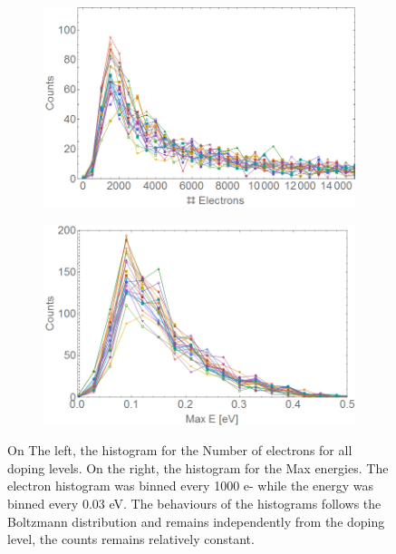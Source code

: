 \begin{figure}[h!]
\centering
\begin{subfigure}[l]{0.49\textwidth}
\includegraphics[width=1\textwidth]{../Images/results/MIR_He_XeCaDop/histoElectr.png} 
\end{subfigure}
\begin{subfigure}[l]{0.49\textwidth}
\includegraphics[width=1\textwidth]{../Images/results/MIR_He_XeCaDop/histoEnerg.png}   				\end{subfigure}
\caption[MIR He-Xe-Ca doping. Histogram]{On The left, the histogram for the Number of electrons for all doping levels. On the right, the histogram for the Max energies. The electron histogram was binned every 1000 e- while the energy was binned every 0.03 eV. The behaviours of the histograms follows the Boltzmann distribution and remains independently from the doping level, the counts remains  relatively constant.}
\label{fig:XeCahisto}
\end{figure}

